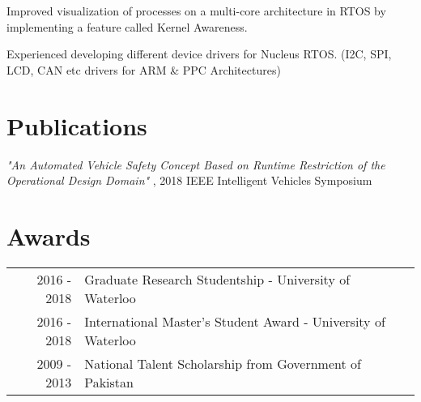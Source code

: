 \documentclass[]{deedy-resume-openfont}
\begin{document}
\begin{minipage}[t]{0.63\textwidth}
\begin{tightemize}
\end{tightemize}
\sectionsep


\begin{tightemize}

\item Improved visualization of processes on a multi-core architecture in RTOS by implementing a feature called Kernel Awareness. 

\item Experienced developing different device drivers for Nucleus RTOS. (I2C, SPI, LCD, CAN etc drivers for ARM \& PPC Architectures)

\end{tightemize}
\sectionsep


\section{Publications}
\textit{"An Automated Vehicle Safety Concept Based on Runtime Restriction of the Operational Design Domain"} , 2018 IEEE Intelligent Vehicles Symposium

\sectionsep


\section{Awards} 
\begin{tabular}{rll}
2016 - 2018	     & Graduate Research Studentship - University of Waterloo  \\
2016 - 2018	     & International Master's Student Award - University of Waterloo\\
2009 - 2013	     & National Talent Scholarship from Government of Pakistan\\


\end{tabular}
\end{minipage}
\end{document}

